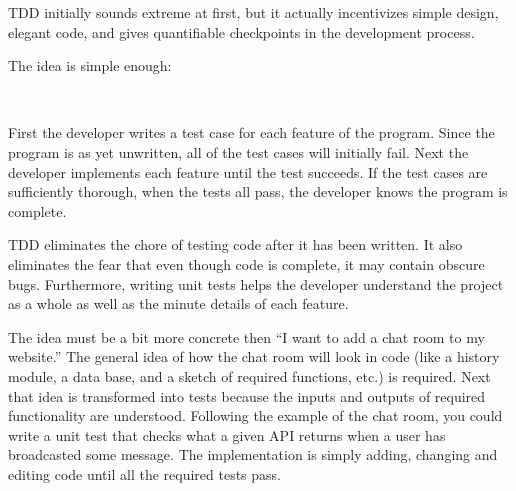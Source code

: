 TDD initially sounds extreme at first, but it actually incentivizes simple design, elegant code, and gives quantifiable checkpoints in the development process.

The idea is simple enough:
\begin{center}
\\
\end{center}

First the developer writes a test case for each feature of the program. Since the program is as yet unwritten, all of the test cases will initially fail. Next the developer implements each feature until the test succeeds. If the test cases are sufficiently thorough, when the tests all pass, the developer knows the program is complete.

TDD eliminates the chore of testing code after it has been written. It also eliminates the fear that even though code is complete, it may contain obscure bugs. Furthermore, writing unit tests helps the developer understand the project as a whole as well as the minute details of each feature.

The idea must be a bit more concrete then ``I want to add a chat room to my website.'' The general idea of how the chat room will look in code (like a history module, a data base, and a sketch of required functions, etc.) is required.
Next that idea is transformed into tests because the inputs and outputs of required functionality are understood.
Following the example of the chat room, you could write a unit test that checks what a given API returns when a user has broadcasted some message.
The implementation is simply adding, changing and editing code until all the required tests pass.

